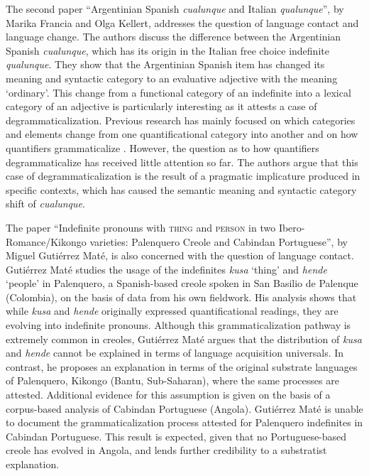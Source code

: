 \documentclass[output=paper,colorlinks,citecolor=brown]{langscibook}
\begin{document}
The second paper “Argentinian Spanish \textit{cualunque} and Italian \textit{qualunque}”, by Marika Francia and Olga Kellert, addresses the question of language contact and language change. The authors discuss the difference between the Argentinian Spanish \textit{cualunque}, which has its origin in the Italian free choice indefinite \textit{qualunque}. They show that the Argentinian Spanish item has changed its meaning and syntactic category to an evaluative adjective with the meaning ‘ordinary’. This change from a functional category of an indefinite into a lexical category of an adjective is particularly interesting as it attests a case of degrammaticalization. Previous research has mainly focused on which categories and elements change from one quantificational category into another \citep{BergarechePérez-Saldanya2011, Verveckken2015} and on how quantifiers grammaticalize \citep{Haspelmath1997, CompanyCompanyPozasLoyo2009}. However, the question as to how quantifiers degrammaticalize has received little attention so far. The authors argue that this case of degrammaticalization is the result of a pragmatic implicature produced in specific contexts, which has caused the semantic meaning and syntactic category shift of \textit{cualunque}.

\begin{sloppypar}
The paper “Indefinite pronouns with \textsc{thing} and \textsc{person} in two Ibero-Romance\slash Kikongo varieties: Palenquero Creole and Cabindan Portuguese”, by Miguel Gutiérrez Maté, is also concerned with the question of language contact. Gutiérrez Maté studies the usage of the indefinites \textit{kusa} ‘thing’ and \textit{hende} ‘people’ in Palenquero, a Spanish-based creole spoken in San Basilio de Palenque (Colombia), on the basis of data from his own fieldwork. His analysis shows that while \textit{kusa} and \textit{hende} originally expressed quantificational readings, they are evolving into indefinite pronouns. Although this grammaticalization pathway is extremely common in creoles, Gutiérrez Maté argues that the distribution of \textit{kusa} and \textit{hende} cannot be explained in terms of language acquisition universals. In contrast, he proposes an explanation in terms of the original substrate languages of Palenquero, Kikongo (Bantu, Sub-Saharan), where the same processes are attested. Additional evidence for this assumption is given on the basis of a corpus-based analysis of Cabindan Portuguese (Angola). Gutiérrez Maté is unable to document the grammaticalization process attested for Palenquero indefinites in Cabindan Portuguese. This result is expected, given that no Portuguese-based creole has evolved in Angola, and lends further credibility to a substratist explanation.
\end{sloppypar}
\end{document}
